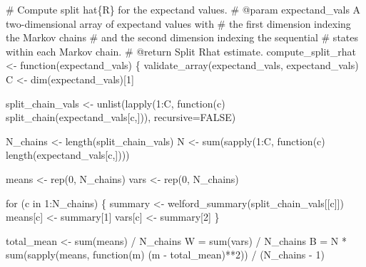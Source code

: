 \documentclass[
  letterpaper,
  DIV=11,
  numbers=noendperiod]{scrartcl}
\newenvironment{Shaded}{\begin{snugshade}}{\end{snugshade}}
\newcommand{\BuiltInTok}[1]{\textcolor[rgb]{0.00,0.23,0.31}{#1}}
\newcommand{\CommentTok}[1]{\textcolor[rgb]{0.37,0.37,0.37}{#1}}
\newcommand{\ControlFlowTok}[1]{\textcolor[rgb]{0.00,0.23,0.31}{#1}}
\newcommand{\DecValTok}[1]{\textcolor[rgb]{0.68,0.00,0.00}{#1}}
\newcommand{\KeywordTok}[1]{\textcolor[rgb]{0.00,0.23,0.31}{#1}}
\newcommand{\NormalTok}[1]{\textcolor[rgb]{0.00,0.23,0.31}{#1}}
\newcommand{\OperatorTok}[1]{\textcolor[rgb]{0.37,0.37,0.37}{#1}}
\newcommand{\StringTok}[1]{\textcolor[rgb]{0.13,0.47,0.30}{#1}}
\begin{document}
\begin{Shaded}
\begin{Highlighting}[]
\CommentTok{\# Compute split hat\{R\} for the expectand values.}
\CommentTok{\# @param expectand\_vals A two{-}dimensional array of expectand values with}
\CommentTok{\#                       the first dimension indexing the Markov chains}
\CommentTok{\#                       and the second dimension indexing the sequential}
\CommentTok{\#                       states within each Markov chain.}
\CommentTok{\# @return Split Rhat estimate.}
\NormalTok{compute\_split\_rhat }\OperatorTok{\textless{}{-}}\NormalTok{ function(expectand\_vals) \{}
\NormalTok{  validate\_array(expectand\_vals, }\StringTok{\textquotesingle{}expectand\_vals\textquotesingle{}}\NormalTok{)}
\NormalTok{  C }\OperatorTok{\textless{}{-}}\NormalTok{ dim(expectand\_vals)[}\DecValTok{1}\NormalTok{]}
  
\NormalTok{  split\_chain\_vals }\OperatorTok{\textless{}{-}}\NormalTok{ unlist(lapply(}\DecValTok{1}\NormalTok{:C,}
\NormalTok{                                    function(c)}
\NormalTok{                                    split\_chain(expectand\_vals[c,])),}
\NormalTok{                             recursive}\OperatorTok{=}\NormalTok{FALSE)}

\NormalTok{  N\_chains }\OperatorTok{\textless{}{-}}\NormalTok{ length(split\_chain\_vals)}
\NormalTok{  N }\OperatorTok{\textless{}{-}} \BuiltInTok{sum}\NormalTok{(sapply(}\DecValTok{1}\NormalTok{:C, function(c) length(expectand\_vals[c,])))}

\NormalTok{  means }\OperatorTok{\textless{}{-}}\NormalTok{ rep(}\DecValTok{0}\NormalTok{, N\_chains)}
  \BuiltInTok{vars} \OperatorTok{\textless{}{-}}\NormalTok{ rep(}\DecValTok{0}\NormalTok{, N\_chains)}

  \ControlFlowTok{for}\NormalTok{ (c }\KeywordTok{in} \DecValTok{1}\NormalTok{:N\_chains) \{}
\NormalTok{    summary }\OperatorTok{\textless{}{-}}\NormalTok{ welford\_summary(split\_chain\_vals[[c]])}
\NormalTok{    means[c] }\OperatorTok{\textless{}{-}}\NormalTok{ summary[}\DecValTok{1}\NormalTok{]}
    \BuiltInTok{vars}\NormalTok{[c] }\OperatorTok{\textless{}{-}}\NormalTok{ summary[}\DecValTok{2}\NormalTok{]}
\NormalTok{  \}}

\NormalTok{  total\_mean }\OperatorTok{\textless{}{-}} \BuiltInTok{sum}\NormalTok{(means) }\OperatorTok{/}\NormalTok{ N\_chains}
\NormalTok{  W }\OperatorTok{=} \BuiltInTok{sum}\NormalTok{(}\BuiltInTok{vars}\NormalTok{) }\OperatorTok{/}\NormalTok{ N\_chains}
\NormalTok{  B }\OperatorTok{=}\NormalTok{ N }\OperatorTok{*} \BuiltInTok{sum}\NormalTok{(sapply(means, function(m)}
\NormalTok{                            (m }\OperatorTok{{-}}\NormalTok{ total\_mean)}\OperatorTok{**}\DecValTok{2}\NormalTok{)) }\OperatorTok{/}\NormalTok{ (N\_chains }\OperatorTok{{-}} \DecValTok{1}\NormalTok{)}


\end{Highlighting}
\end{Shaded}
\end{document}

